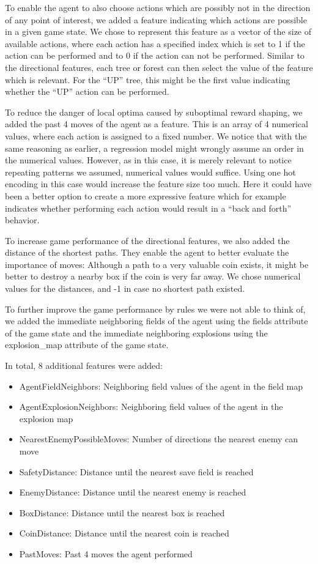 \documentclass{article}
\begin{document}
To enable the agent to also choose actions which are possibly not in the direction of any point of interest, we added a feature indicating which actions are possible in a given game state. We chose to represent this feature as a vector of the size of available actions, where each action has a specified index which is set to 1 if the action can be performed and to 0 if the action can not be performed. Similar to the directional features, each tree or forest can then select the value of the feature which is relevant. For the “UP” tree, this might be the first value indicating whether the “UP” action can be performed.

To reduce the danger of local optima caused by suboptimal reward shaping, we added the past 4 moves of the agent as a feature. This is an array of 4 numerical values, where each action is assigned to a fixed number. We notice that with the same reasoning as earlier, a regression model might wrongly assume an order in the numerical values. However, as in this case, it is merely relevant to notice repeating patterns we assumed, numerical values would suffice. Using one hot encoding in this case would increase the feature size too much. Here it could have been a better option to create a more expressive feature which for example indicates whether performing each action would result in a “back and forth” behavior.

To increase game performance of the directional features, we also added the distance of the shortest paths. They enable the agent to better evaluate the importance of moves: Although a path to a very valuable coin exists, it might be better to destroy a nearby box if the coin is very far away. We chose numerical values for the distances, and -1 in case no shortest path existed.

To further improve the game performance by rules we were not able to think of, we added the immediate neighboring fields of the agent using the fields attribute of the game state and the immediate neighboring explosions using the explosion\_map attribute of the game state.

In total, 8 additional features were added:

\begin{itemize}
    \item AgentFieldNeighbors: Neighboring field values of the agent in the field map
    \item AgentExplosionNeighbors: Neighboring field values of the agent in the explosion map
    \item NearestEnemyPossibleMoves: Number of directions the nearest enemy can move
    \item SafetyDistance: Distance until the nearest save field is reached
    \item EnemyDistance: Distance until the nearest enemy is reached
    \item BoxDistance: Distance until the nearest box is reached
    \item CoinDistance: Distance until the nearest coin is reached
    \item PastMoves: Past 4 moves the agent performed
\end{itemize}
\end{document}
